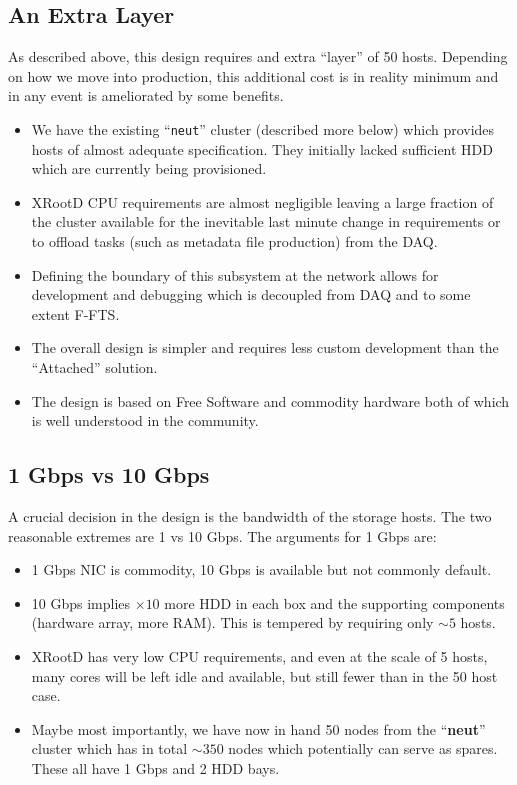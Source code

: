 \documentclass[pdftex,12pt,letter]{article}
\newcommand{\xrd}{XRootD\xspace}
\begin{document}
\subsection{An Extra Layer}

As described above, this design requires and extra ``layer'' of 50
hosts.  Depending on how we move into production, this additional cost
is in reality minimum and in any event is ameliorated by some benefits.

\begin{itemize}
\item We have the existing ``\texttt{neut}'' cluster (described more
  below) which provides hosts of almost adequate specification.  They
  initially lacked sufficient HDD which are currently being provisioned.
\item \xrd CPU requirements are almost negligible leaving a large
  fraction of the cluster available for the inevitable last minute
  change in requirements or to offload tasks (such as metadata file
  production) from the DAQ.
\item Defining the boundary of this subsystem at the network allows
  for development and debugging which is decoupled from DAQ and to
  some extent F-FTS.
\item The overall design is simpler and requires less custom
  development than the ``Attached'' solution.
\item The design is based on Free Software and commodity hardware both
  of which is well understood in the community.
\end{itemize}

\subsection{1 Gbps vs 10 Gbps}

A crucial decision in the design is the bandwidth of the storage
hosts.  The two reasonable extremes are 1 vs 10 Gbps.  The arguments
for 1 Gbps are:

\begin{itemize}
\item 1 Gbps NIC is commodity, 10 Gbps is available but not commonly default.
\item 10 Gbps implies $\times 10$ more HDD in each box and the
  supporting components (hardware array, more RAM).  This is tempered
  by requiring only $\sim 5$ hosts.
\item \xrd has very low CPU requirements, and even at the scale of 5
  hosts, many cores will be left idle and available, but still fewer
  than in the 50 host case.
\item Maybe most importantly, we have now in hand 50 nodes from the
  ``\textbf{neut}'' cluster which has in total $\sim 350$ nodes which
  potentially can serve as spares.  These all have 1 Gbps and 2 HDD
  bays.
\end{itemize}
\end{document}
